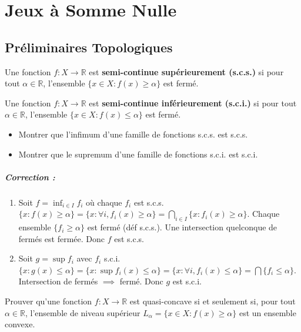 \chapter{Jeux à Somme Nulle}

\section{Préliminaires Topologiques}

\begin{definition}
Une fonction $f:X \to \mathbb{R}$ est \textbf{semi-continue supérieurement (s.c.s.)} si pour tout $\alpha \in \mathbb{R}$, l'ensemble $\{x \in X : f(x) \ge \alpha\}$ est fermé.

Une fonction $f:X \to \mathbb{R}$ est \textbf{semi-continue inférieurement (s.c.i.)} si pour tout $\alpha \in \mathbb{R}$, l'ensemble $\{x \in X : f(x) \le \alpha\}$ est fermé.
\end{definition}

\begin{exercice}
\begin{itemize}
    \item Montrer que l'infimum d'une famille de fonctions s.c.s. est s.c.s.
    \item Montrer que le supremum d'une famille de fonctions s.c.i. est s.c.i.
\end{itemize}
\paragraph{Correction :}
\begin{enumerate}
    \item Soit $f = \inf_{i \in I} f_i$ où chaque $f_i$ est s.c.s.
    $ \{ x : f(x) \ge \alpha \} = \{ x : \forall i, f_i(x) \ge \alpha \} = \bigcap_{i \in I} \{ x : f_i(x) \ge \alpha \} $.
    Chaque ensemble $\{ f_i \ge \alpha \}$ est fermé (déf s.c.s.). Une intersection quelconque de fermés est fermée. Donc $f$ est s.c.s.
    
    \item Soit $g = \sup f_i$ avec $f_i$ s.c.i.
    $ \{ x : g(x) \le \alpha \} = \{ x : \sup f_i(x) \le \alpha \} = \{ x : \forall i, f_i(x) \le \alpha \} = \bigcap \{ f_i \le \alpha \}$.
    Intersection de fermés $\implies$ fermé. Donc $g$ est s.c.i.
\end{enumerate}
\end{exercice}


\begin{exercice}
Prouver qu'une fonction $f:X \to \mathbb{R}$ est quasi-concave si et seulement si, pour tout $\alpha \in \mathbb{R}$, l'ensemble de niveau supérieur $L_{\alpha} = \{x \in X : f(x) \ge \alpha\}$ est un ensemble convexe.
\end{exercice}

